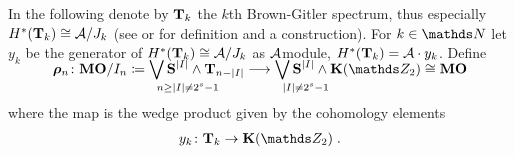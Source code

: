 \begin{Def*}
  In the following denote by $\bm{\mathrm{T}}{}_{k}$ the $k$th
  Brown-Gitler spectrum, thus especially
  $H^*(\bm{\mathrm{T}}{}_{k})\cong\mathcal{A}/J_{k}$
  (see \cite{browngitler} or \cite[p.~101]{immersionconj} for
  definition and a construction).
  For $k\in\Nat$ let $y_k$ be the generator of
  $H^*(\bm{\mathrm{T}}{}_{k})\cong \mathcal{A}/J_{k}$ as $\mathcal{A}$\nbd{}module,
  \idest $H^*(\bm{\mathrm{T}}{}_{k})=\mathcal{A}\cdot y_k$.
  Define
  \begin{gather*}
    \SwapAboveDisplaySkip
    \bm{\rho}_n\colon
    \MOmodI n
    \coloneqq \bigvee_{\mathrlap{n\geq\Deg{I}\neq 2^s-1}}
    \Spherespec{\Deg{I}} \smashprod \BrownGitler{n-\Deg{I}}
    \longto
    \bigvee_{\mathrlap{\Deg{I}\neq 2^s-1}}
    \Spherespec{\Deg{I}} \smashprod \EMspec
    \cong \MOspec
  \end{gather*}
  where the map is the wedge product given by the cohomology elements
  \begin{gather*}
    y_k\colon\BrownGitler k \to \EMspec
    \;.
  \end{gather*}
\end{Def*}

